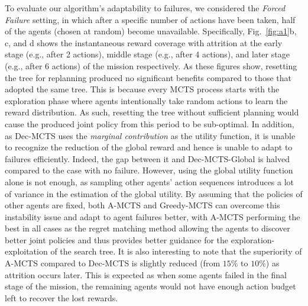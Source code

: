 To evaluate our algorithm's adaptability to failures, we considered the \emph{Forced Failure} setting, in which after a specific number of actions have been taken, half of the agents (chosen at random) become unavailable. Specifically, Fig.~\ref{fig:a1}b, c, and d shows the instantaneous reward coverage with attrition at the early stage (e.g., after 2 actions), middle stage (e.g., after 4 actions), and later stage (e.g., after 6 actions) of the mission respectively. As these figures show, resetting the tree for replanning produced no significant benefits compared to those that adopted the same tree. This is because every MCTS process starts with the exploration phase where agents intentionally take random actions to learn the reward distribution. As such, resetting the tree without sufficient planning would cause the produced joint policy from this period to be sub-optimal. In addition, as Dec-MCTS uses the \emph{marginal contribution} as the utility function, it is unable to recognize the reduction of the global reward and hence is unable to adapt to failures efficiently. Indeed, the gap between it and Dec-MCTS-Global is halved compared to the case with no failure. However, using the global utility function alone is not enough, as sampling other agents' action sequences introduces a lot of variance in the estimation of the global utility. By assuming that the policies of other agents are fixed, both A-MCTS and Greedy-MCTS can overcome this instability issue and adapt to agent failures better, with A-MCTS performing the best in all cases as the regret matching method allowing the agents to discover better joint policies and thus provides better guidance for the exploration-exploitation of the search tree. It is also interesting to note that the superiority of A-MCTS compared to Dec-MCTS is slightly reduced (from $15\%$ to $10\%$) as attrition occurs later. This is expected as when some agents failed in the final stage of the mission, the remaining agents would not have enough action budget left to recover the lost rewards.
